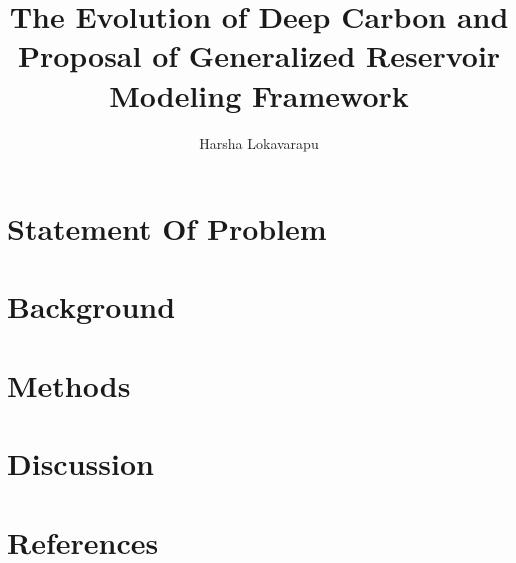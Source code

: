 \documentclass[review]{elsarticle}
\begin{document}
\begin{frontmatter}
\title{\textbf{The Evolution of Deep Carbon and Proposal of Generalized Reservoir Modeling Framework}}
\address[address1]{Department of Earth and Planetary Sciences, University of California, Davis, CA 95616, USA}

\author[address1]{Harsha Lokavarapu }

\date{}
\begin{abstract}

\end{abstract}
\end{frontmatter}

\section{Statement Of Problem}
  
 
\section{Background}


% 

\section{Methods}


\section{Discussion}

  
\newpage
\section*{References}
 

\end{document}
